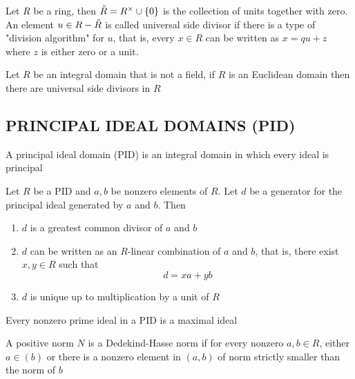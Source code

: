 \begin{definition}
	Let $R$ be a ring, then $\Tilde{R} = R^\times \cup \{0\}$ is the collection of units together with zero. An element $u \in R - \Tilde{R}$ is called universal side divisor if there is a type of "division algorithm" for $u$, that is, every $x \in R$ can be written as $x = qu + z$ where $z$ is either zero or a unit.
\end{definition}

\begin{proposition}
	Let $R$ be an integral domain that is not a field, if $R$ is an Euclidean domain then there are universal side divisors in $R$
\end{proposition}

\subsection{PRINCIPAL IDEAL DOMAINS (PID)}

\begin{definition}
	A principal ideal domain (PID) is an integral domain in which every ideal is principal
\end{definition}

\begin{proposition}
	Let $R$ be a PID and $a, b$ be nonzero elements of $R$. Let $d$ be a generator for the principal ideal generated by $a$ and $b$. Then
	\begin{enumerate}
		\item $d$ is a greatest common divisor of $a$ and $b$
		\item $d$ can be written as an $R$-linear combination of $a$ and $b$, that is, there exist $x, y \in R$ such that
		$$
			d = xa + yb
		$$
		\item $d$ is unique up to multiplication by a unit of $R$
	\end{enumerate}
\end{proposition}

\begin{proposition}
	Every nonzero prime ideal in a PID is a maximal ideal
\end{proposition}

\begin{definition}
	A positive norm $N$ is a Dedekind-Hasse norm if for every nonzero $a, b \in R$, either $a \in (b)$ or there is a nonzero element in $(a, b)$ of norm strictly smaller than the norm of $b$
\end{definition}

